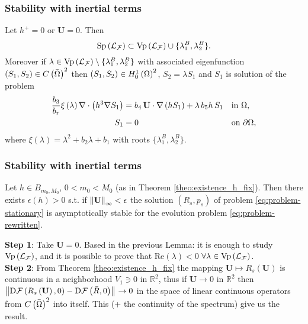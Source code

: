 \documentclass[10pt,aspectratio=169]{beamer}
\begin{document}
\begin{frame}
\frametitle{Stability with inertial terms}
\vspace*{0.5cm}
\begin{lemma}\label{lemma:spec-L_F}
	Let $h^+=0$ or $\mathbf{U}=0$. Then
	\begin{equation}
	\textnormal{Sp}\left(\mathcal{L}_\mathcal{F}\right)\subset \textnormal{Vp}\left(\mathcal{L}_\mathcal{F}\right)\cup \{\lambda_1^B,\lambda_2^B\}.
	\end{equation}
	Moreover if $\lambda\in \textnormal{Vp}\left(\mathcal{L}_\mathcal{F}\right)\setminus\{\lambda_1^B,\lambda_2^B\}$ with associated eigenfunction $\left(S_1,S_2\right)\in C\left(\bar{\Omega}\right)^2$ then $\left(S_1,S_2\right)\in H^1_0\left(\Omega\right)^2$, $S_2=\lambda S_1$ and $S_1$ is solution of the problem
	\begin{align*}
	\frac{b_3}{b_r}\xi\left(\lambda\right)\nabla\cdot\left(h^3\nabla S_1\right)&=b_4\, \mathbf{U}\cdot\nabla\left(hS_1\right)+\lambda\, b_5 h\, S_1 && \textnormal{in }\Omega,\\
	S_1&=0&&\textnormal{on }\partial\Omega,
	\end{align*}
	where $\xi\left(\lambda\right)=\lambda^2+b_2\lambda+b_1$ with roots $\{\lambda_1^B,\lambda_2^B\}$.
\end{lemma}

\end{frame}


\begin{frame}
\frametitle{Stability with inertial terms}
\begin{theorem}\label{theo:stabilite-avec-inertie-h-fixe} Let $h\in B_{m_0,M_0}$, $0<m_0<M_0$ (as in Theorem \ref{theo:existence_h_fix}). Then there exists $\epsilon\left(h\right)>0$ s.t. if $\left\lVert\mathbf{U}\right\rVert_{\infty}<\epsilon$ the solution $\left(R_s,p_s\right)$ of problem \eqref{eq:problem-stationary} is asymptotically stable for the evolution problem \eqref{eq:problem-rewritten}.
\end{theorem}\bigskip
\textbf{Step 1}: Take $\mathbf{U}=0$. Based in the previous Lemma: it is enough to study $\textnormal{Vp}\left(\mathcal{L}_\mathcal{F}\right)$, and it is possible to prove that  $\mbox{Re}\left(\lambda\right)<0$ $\forall \lambda \in \textnormal{Vp}\left(\mathcal{L}_\mathcal{F}\right)$.\\ \bigskip
\textbf{Step 2}: From Theorem \ref{theo:existence_h_fix} the mapping $\mathbf{U}\mapsto R_s\left(\mathbf{U}\right)$ is continuous in a neighborhood $V_1\ni 0$ in $\mathbb{R}^2$, thus if $\mathbf{U}\rightarrow 0$ in $\mathbb{R}^2$ then $\left\lVert\textnormal{D}\mathcal{F}\left(R_s\left(\mathbf{U}\right),0\right)-\textnormal{D}\mathcal{F}\left(\bar{R},0\right)\right\rVert_{}\rightarrow 0$ in the space of linear continuous operators from $C\left(\bar{\Omega}\right)^2$ into itself. This (+ the continuity of the spectrum) give us the result.
\end{frame}
\end{document}
